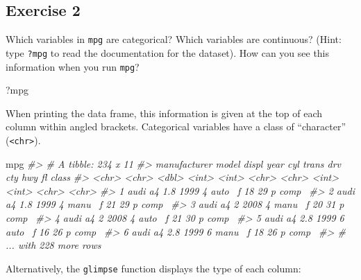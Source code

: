 \documentclass[]{book}
\newenvironment{Shaded}{\begin{snugshade}}{\end{snugshade}}
\newcommand{\CommentTok}[1]{\textcolor[rgb]{0.56,0.35,0.01}{\textit{#1}}}
\newcommand{\NormalTok}[1]{#1}
\theoremstyle{plain}
\theoremstyle{remark}
\theoremstyle{definition}
\theoremstyle{definition}
\theoremstyle{definition}
\theoremstyle{remark}
\begin{document}
\hypertarget{exercise-2}{%
\subsection{Exercise 2}\label{exercise-2}}

Which variables in \texttt{mpg} are categorical? Which variables are
continuous? (Hint: type \texttt{?mpg} to read the documentation for the
dataset). How can you see this information when you run \texttt{mpg}?

\begin{Shaded}
\begin{Highlighting}[]
\NormalTok{?mpg}
\end{Highlighting}
\end{Shaded}

When printing the data frame, this information is given at the top of
each column within angled brackets. Categorical variables have a class
of ``character'' (\texttt{\textless{}chr\textgreater{}}).

\begin{Shaded}
\begin{Highlighting}[]
\NormalTok{mpg}
\CommentTok{#> # A tibble: 234 x 11}
\CommentTok{#>   manufacturer model displ  year   cyl trans drv     cty   hwy fl    class}
\CommentTok{#>   <chr>        <chr> <dbl> <int> <int> <chr> <chr> <int> <int> <chr> <chr>}
\CommentTok{#> 1 audi         a4      1.8  1999     4 auto~ f        18    29 p     comp~}
\CommentTok{#> 2 audi         a4      1.8  1999     4 manu~ f        21    29 p     comp~}
\CommentTok{#> 3 audi         a4      2    2008     4 manu~ f        20    31 p     comp~}
\CommentTok{#> 4 audi         a4      2    2008     4 auto~ f        21    30 p     comp~}
\CommentTok{#> 5 audi         a4      2.8  1999     6 auto~ f        16    26 p     comp~}
\CommentTok{#> 6 audi         a4      2.8  1999     6 manu~ f        18    26 p     comp~}
\CommentTok{#> # ... with 228 more rows}
\end{Highlighting}
\end{Shaded}

Alternatively, the \texttt{glimpse} function displays the type of each
column:
\end{document}
